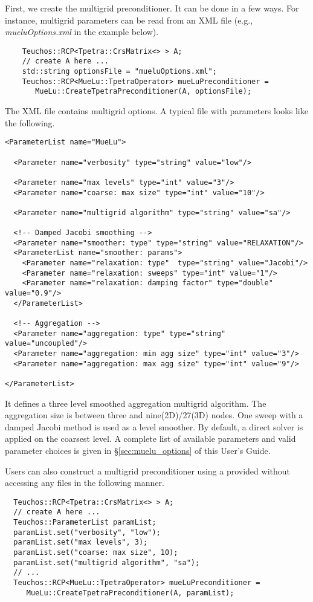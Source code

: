 First, we create the \muelu{} multigrid preconditioner. It can be done in a few
ways. For instance, multigrid parameters can be read from an XML file
(e.g., \textit{mueluOptions.xml} in the example below).
\begin{lstlisting}
    Teuchos::RCP<Tpetra::CrsMatrix<> > A;
    // create A here ...
    std::string optionsFile = "mueluOptions.xml";
    Teuchos::RCP<MueLu::TpetraOperator> mueLuPreconditioner =
       MueLu::CreateTpetraPreconditioner(A, optionsFile);
\end{lstlisting}
The XML file contains multigrid options. A typical file with \muelu{} parameters
looks like the following.
\begin{lstlisting}
<ParameterList name="MueLu">

  <Parameter name="verbosity" type="string" value="low"/>

  <Parameter name="max levels" type="int" value="3"/>
  <Parameter name="coarse: max size" type="int" value="10"/>

  <Parameter name="multigrid algorithm" type="string" value="sa"/>

  <!-- Damped Jacobi smoothing -->
  <Parameter name="smoother: type" type="string" value="RELAXATION"/>
  <ParameterList name="smoother: params">
    <Parameter name="relaxation: type"  type="string" value="Jacobi"/>
    <Parameter name="relaxation: sweeps" type="int" value="1"/>
    <Parameter name="relaxation: damping factor" type="double" value="0.9"/>
  </ParameterList>

  <!-- Aggregation -->
  <Parameter name="aggregation: type" type="string" value="uncoupled"/>
  <Parameter name="aggregation: min agg size" type="int" value="3"/>
  <Parameter name="aggregation: max agg size" type="int" value="9"/>

</ParameterList>
\end{lstlisting}
It defines a three level smoothed aggregation multigrid algorithm. The
aggregation size is between three and nine(2D)/27(3D) nodes.  One sweep with a
damped Jacobi method is used as a level smoother. By default, a direct solver is
applied on the coarsest level. A complete list of available parameters and valid
parameter choices is given in \S\ref{sec:muelu_options} of this User's Guide.

Users can also construct a multigrid preconditioner using a provided \parameterlist
without accessing any files in the following manner.
\begin{lstlisting}
  Teuchos::RCP<Tpetra::CrsMatrix<> > A;
  // create A here ...
  Teuchos::ParameterList paramList;
  paramList.set("verbosity", "low");
  paramList.set("max levels", 3);
  paramList.set("coarse: max size", 10);
  paramList.set("multigrid algorithm", "sa");
  // ...
  Teuchos::RCP<MueLu::TpetraOperator> mueLuPreconditioner =
     MueLu::CreateTpetraPreconditioner(A, paramList);
\end{lstlisting}

